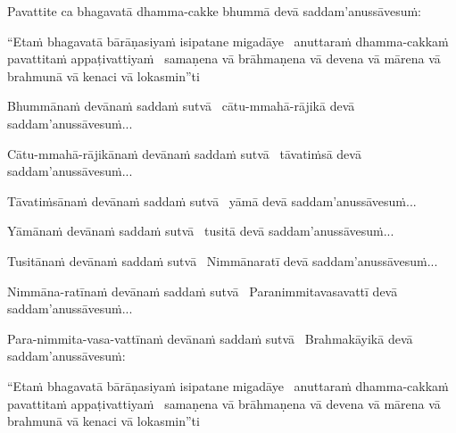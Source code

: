 \begin{pali-hang}
  Pavattite ca bhagavatā dhamma-cakke bhummā devā saddam'anussāvesuṁ:
\end{pali-hang}

\begin{pali-hang}
  ``Etaṁ bhagavatā bārāṇasiyaṁ isipatane migadāye \breathmark\ anuttaraṁ dhamma-cakkaṁ pavattitaṁ appaṭivattiyaṁ \breathmark\ samaṇena vā brāhmaṇena vā devena vā mārena vā brahmunā vā kenaci vā lokasmin''ti
\end{pali-hang}

\begin{pali-hang}
  Bhummānaṁ devānaṁ saddaṁ sutvā \breathmark\ cātu-mmahā-rājikā devā saddam'anussāvesuṁ...
\end{pali-hang}

\begin{pali-hang}
  Cātu-mmahā-rājikānaṁ devānaṁ saddaṁ sutvā \breathmark\ tāvatiṁsā devā saddam'anussāvesuṁ...
\end{pali-hang}

\begin{pali-hang}
  Tāvatiṁsānaṁ devānaṁ saddaṁ sutvā \breathmark\ yāmā devā saddam'anussāvesuṁ...
\end{pali-hang}

\begin{pali-hang}
  Yāmānaṁ devānaṁ saddaṁ sutvā \breathmark\ tusitā devā saddam'anussāvesuṁ...
\end{pali-hang}

\begin{pali-hang}
  Tusitānaṁ devānaṁ saddaṁ sutvā \breathmark\ Nimmānaratī devā saddam'anussāvesuṁ...
\end{pali-hang}

\begin{pali-hang}
  Nimmāna-ratīnaṁ devānaṁ saddaṁ sutvā \breathmark\ Paranimmitavasavattī devā saddam'anussāvesuṁ...
\end{pali-hang}

\begin{pali-hang}
  Para-nimmita-vasa-vattīnaṁ devānaṁ saddaṁ sutvā \breathmark\ Brahmakāyikā devā saddam'anussāvesuṁ:
\end{pali-hang}

\begin{pali-hang}
  ``Etaṁ bhagavatā bārāṇasiyaṁ isipatane migadāye \breathmark\ anuttaraṁ dhamma-cakkaṁ pavattitaṁ appaṭivattiyaṁ \breathmark\ samaṇena vā brāhmaṇena vā devena vā mārena vā brahmunā vā kenaci vā lokasmin''ti
\end{pali-hang}

